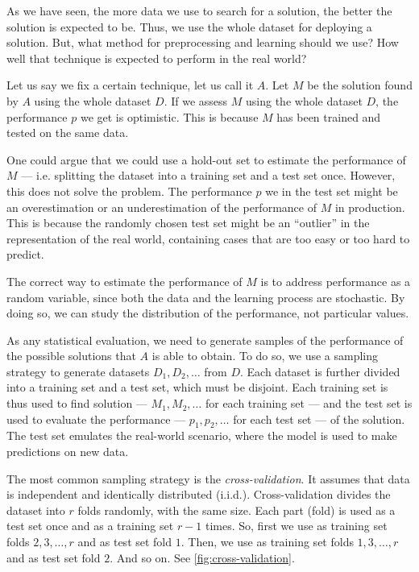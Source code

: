 As we have seen, the more data we use to search for a solution, the better the solution is
expected to be.  Thus, we use the whole dataset for deploying a solution.  But, what
method for preprocessing and learning should we use?  How well that technique is
expected to perform in the real world?

Let us say we fix a certain technique, let us call it $A$.  Let $M$ be the solution found
by $A$ using the whole dataset $D$.  If we assess $M$ using the whole dataset $D$, the
performance $p$ we get is optimistic.  This is because $M$ has been trained and tested
on the same data.

One could argue that we could use a hold-out set to estimate the performance of $M$ ---
i.e. splitting the dataset into a training set and a test set once.  However, this does
not solve the problem.  The performance $p$ we in the test set might be an overestimation
or an underestimation of the performance of $M$ in production.  This is because the
randomly chosen test set might be an ``outlier'' in the representation of the real world,
containing cases that are too easy or too hard to predict.

The correct way to estimate the performance of $M$ is to address performance as a
random variable, since both the data and the learning process are stochastic.
By doing so, we can study the distribution of the performance, not particular values.

As any statistical evaluation, we need to generate samples
of the performance of the possible solutions that $A$ is able to obtain. To do so, we use
a sampling strategy to generate datasets $D_1, D_2, \ldots$ from $D$.  Each
dataset is further divided into a training set and a test set, which must be disjoint.
Each training set is thus used to find solution --- $M_1, M_2, \ldots$ for each
training set --- and the test set is used to evaluate the performance --- $p_1, p_2,
\ldots$ for each test set --- of the solution.  The test set emulates the real-world
scenario, where the model is used to make predictions on new data.

The most common sampling strategy is the \emph{cross-validation}.  It assumes that data is
independent and identically distributed (i.i.d.).  Cross-validation divides
the dataset into $r$ folds randomly, with the same size.  Each part (fold) is used as a
test set once and as a training set $r-1$ times.  So, first we use as training set folds
$2, 3, \ldots, r$ and as test set fold $1$.  Then, we use as training set folds $1, 3,
\ldots, r$ and as test set fold $2$. And so on.  See \cref{fig:cross-validation}.

